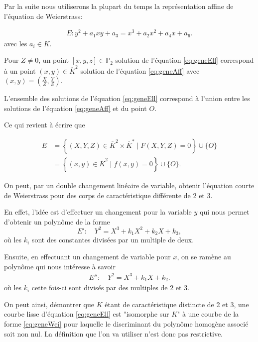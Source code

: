 Par la suite nous utiliserons la plupart du temps la représentation affine de
l'équation de Weierstrass:

\begin{align}
    \label{eq:geneAff}
E : y^2 + a_1xy + a_3 = x^3 +a_2x^2+a_4x+a_6
.\end{align}
avec les $a_{i} \in K$. 

Pour $Z \neq 0$, un point $[x,y,z] \in \mathbb{P}_{2}$ solution de l'équation
\eqref{eq:geneEll} correspond à un point $(x,y) \in \overline{K}^2$ solution de
l'équation \eqref{eq:geneAff} avec $(x,y)=(\frac{X}{Z},\frac{Y}{Z})$.

L'ensemble des solutions de l'équation \eqref{eq:geneEll} correspond à l'union entre les
solutions de l'équation \eqref{eq:geneAff} et du point $O$.

Ce qui revient à écrire que

\begin{align*}
    E &= \left\{ (X,Y,Z) \in \overline{K}^2 \times \overline{K}^{*} \mid F(X,Y,Z) = 0 \right\}  \cup
\{O\} \\
&= \left\{ (x,y) \in \overline{K}^2 \mid f(x,y) = 0 \right\} \cup \{O\}
.\end{align*}

On peut, par un double changement linéaire de variable, obtenir l'équation courte de Weierstrass
pour des corps de caractéristique différente de 2 et 3.

En effet, l'idée est d'effectuer un changement pour la variable $y$ qui nous permet
d'obtenir un polynôme de la forme
\[
E' :\quad Y^2 = X^3 + k_1X^2 + k_2X + k_3
,\] 
où les $k_{i}$ sont des constantes divisées par un multiple de deux.

Ensuite, en effectuant un changement de variable pour $x$, on se ramène au polynôme qui nous
intéresse à savoir 
\begin{align}
    \label{eq:geneWei}
E'' :\quad Y^2 = X^3 + k_1X + k_2
.\end{align}
où les $k_{i}$ cette fois-ci sont divisés par des multiples de 2 et 3.

On peut ainsi, démontrer que $K$ étant de caractéristique distincte de 2 et 3, une courbe
lisse d'équation \eqref{eq:geneEll} est "isomorphe sur $K$" à une courbe de la forme
\eqref{eq:geneWei} pour laquelle le discriminant du polynôme homogène
associé soit non nul.  La définition que l'on va utiliser n'est donc pas restrictive.


